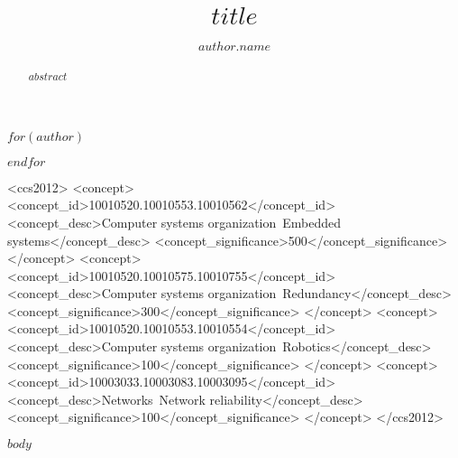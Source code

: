 \documentclass[sigchi-a, authorversion]{acmart}
\begin{document}
\title[$short-title$]{$title$}

$for(author)$
  \author{$author.name$}
$endfor$

\renewcommand{\shortauthors}{$short-authors$}


%
%
\begin{CCSXML}
<ccs2012>
 <concept>
  <concept_id>10010520.10010553.10010562</concept_id>
  <concept_desc>Computer systems organization~Embedded systems</concept_desc>
  <concept_significance>500</concept_significance>
 </concept>
 <concept>
  <concept_id>10010520.10010575.10010755</concept_id>
  <concept_desc>Computer systems organization~Redundancy</concept_desc>
  <concept_significance>300</concept_significance>
 </concept>
 <concept>
  <concept_id>10010520.10010553.10010554</concept_id>
  <concept_desc>Computer systems organization~Robotics</concept_desc>
  <concept_significance>100</concept_significance>
 </concept>
 <concept>
  <concept_id>10003033.10003083.10003095</concept_id>
  <concept_desc>Networks~Network reliability</concept_desc>
  <concept_significance>100</concept_significance>
 </concept>
</ccs2012>
\end{CCSXML}



\begin{abstract}
  $abstract$
\end{abstract}



\maketitle

$body$



\end{document}
